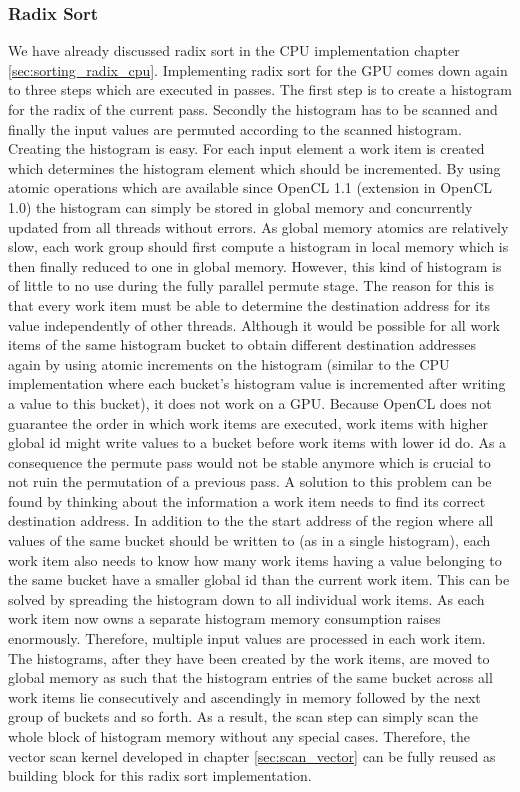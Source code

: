 \subsubsection{Radix Sort}
\label{sec:sorting_radix}

We have already discussed radix sort in the CPU implementation chapter \ref{sec:sorting_radix_cpu}. Implementing radix sort for the GPU comes down again to three steps which are executed in passes. The first step is to create a histogram for the radix of the current pass. Secondly the histogram has to be scanned and finally the input values are permuted according to the scanned histogram. 
Creating the histogram is easy. For each input element a work item is created which determines the histogram element which should be incremented. By using atomic operations which are available since OpenCL 1.1 (extension in OpenCL 1.0) the histogram can simply be stored in global memory and concurrently updated from all threads without errors. As global memory atomics are relatively slow, each work group should first compute a histogram in local memory which is then finally reduced to one in global memory.
However, this kind of histogram is of little to no use during the fully parallel permute stage. The reason for this is that every work item must be able to determine the destination address for its value independently of other threads. Although it would be possible for all work items of the same histogram bucket to obtain different destination addresses again by using atomic increments on the histogram (similar to the CPU implementation where each bucket's histogram value is incremented after writing a value to this bucket), it does not work on a GPU. Because OpenCL does not guarantee the order in which work items are executed, work items with higher global id might write values to a bucket before work items with lower id do. As a consequence the permute pass would not be stable anymore which is crucial to not ruin the permutation of a previous pass.
A solution to this problem can be found by thinking about the information a work item needs to find its correct destination address. In addition to the the start address of the region where all values of the same bucket should be written to (as in a single histogram), each work item also needs to know how many work items having a value belonging to the same bucket have a smaller global id than the current work item. This can be solved by spreading the histogram down to all individual work items. As each work item now owns a separate histogram memory consumption raises enormously. Therefore, multiple input values are processed in each work item. The histograms, after they have been created by the work items, are moved to global memory as such that the histogram entries of the same bucket across all work items lie consecutively and ascendingly in memory followed by the next group of buckets and so forth. As a result, the scan step can simply scan the whole block of histogram memory without any special cases. Therefore, the vector scan kernel developed in chapter \ref{sec:scan_vector} can be fully reused as building block for this radix sort implementation. 

